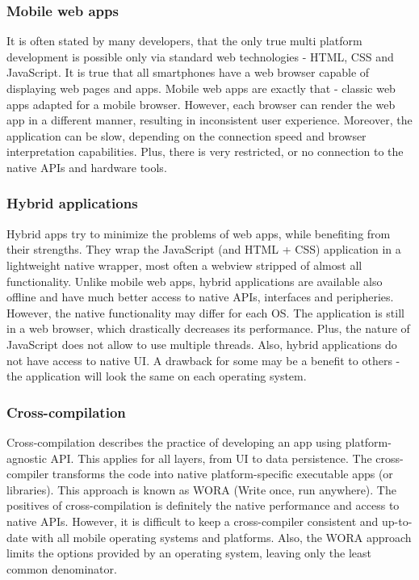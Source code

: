 \documentclass[english,master,public,dept460,male,cpdeclaration,oneside]{diploma}
\begin{document}
\subsubsection{Mobile web apps}
It is often stated by many developers, that the only true multi platform development is possible only via standard web technologies - HTML, CSS and JavaScript. It is true that all smartphones have a web browser capable of displaying web pages and apps. Mobile web apps are exactly that - classic web apps adapted for a mobile browser. However, each browser can render the web app in a different manner, resulting in inconsistent user experience. Moreover, the application can be slow, depending on the connection speed and browser interpretation capabilities. Plus, there is very restricted, or no connection to the native APIs and hardware tools.

\subsubsection{Hybrid applications}
Hybrid apps try to minimize the problems of web apps, while benefiting from their strengths. They wrap the JavaScript (and HTML + CSS) application in a lightweight native wrapper, most often a webview stripped of almost all functionality. Unlike mobile web apps, hybrid applications are available also offline and have much better access to native APIs, interfaces and peripheries. However, the native functionality may differ for each OS. The application is still in a web browser, which drastically decreases its performance. Plus, the nature of JavaScript does not allow to use multiple threads. Also, hybrid applications do not have access to native UI. A drawback for some may be a benefit to others - the application will look the same on each operating system. 

\subsubsection{Cross-compilation}
Cross-compilation describes the practice of developing an app using platform-agnostic API. This applies for all layers, from UI to data persistence. The cross-compiler transforms the code into native platform-specific executable apps (or libraries). This approach is known as WORA (Write once, run anywhere). The positives of cross-compilation is definitely the native performance and access to native APIs. However, it is difficult to keep a cross-compiler consistent and up-to-date with all mobile operating systems and platforms. Also, the WORA approach limits the options provided by an operating system, leaving only the least common denominator.
\end{document}
